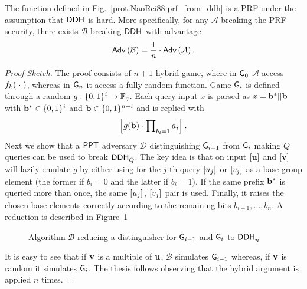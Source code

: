 \begin{proposition}
	\label{prop:NaoRei97}
	The function defined in Fig.~\ref{prot:NaoRei88:prf_from_ddh} is a PRF under the assumption that $\mathsf{DDH}^{}$ is hard.
	More specifically, for any $\mathcal{A}$ breaking the PRF security, there exists $\mathcal{B}$ breaking $\mathsf{DDH}^{}$ with advantage
	\[
		\mathsf{Adv}\left(\mathcal{B}\right) = \frac{1}{n} \cdot \mathsf{Adv}\left(\mathcal{A}\right).
	\]
\end{proposition}
\begin{proof}[Proof Sketch]
	The proof consists of $n+1$ hybrid game, where in $\mathsf{G}_0$ $\mathcal{A}$ access $f_k(\; \cdot \;)$, whereas in $\mathsf{G}_n$ it access a fully random function.
	Game $\mathsf{G}_i$ is defined through a random $g: \{0, 1\}^i \to \mathbb{F}_q$. 
	Each query input $x$ is parsed as $x = \mathbf{b}^\ast || \mathbf{b}$ with $\mathbf{b}^\ast \in \{0, 1\}^i$ and $\mathbf{b} \in \{0, 1\}^{n-i}$ and is replied with
	\[
		\left[{g(\mathbf{b}) \cdot \prod\nolimits_{b_i = 1} a_i}\right]_{}.
	\]
	Next we show that a $\mathsf{PPT}$ adversary $\mathcal{D}$ distinguishing $\mathsf{G}_{i-1}$ from $\mathsf{G}_i$ making $Q$ queries can be used to break $\mathsf{DDH}^{}_{Q}$.
	The key idea is that on input $\left[{\mathbf{u}}\right]_{}$ and $\left[{\mathbf{v}}\right]_{}$ will lazily emulate $g$ by either using for the $j$-th query $\left[{u_j}\right]_{}$ or $\left[{v_j}\right]_{}$ as a base group element (the former if $b_i = 0$ and the latter if $b_i = 1$).
	If the same prefix $\mathbf{b}^\ast$ is queried more than once, the same $\left[{u_j}\right]_{}$, $\left[{v_j}\right]_{}$ pair is used.
	Finally, it raises the chosen base elements correctly according to the remaining bits $b_{i+1}, \ldots, b_n$. 
	A reduction is described in Figure~\ref{prot:NaoRei97:DDH_reduction}
	
	\begin{figure}[htb]
	\centering
	\label{prot:NaoRei97:DDH_reduction}
	\caption{Algorithm $\mathcal{B}$ reducing a distinguisher for $\mathsf{G}_{i-1}$ and $\mathsf{G}_i$ to $\mathsf{DDH}^{}_n$}
	\end{figure}
	
	It is easy to see that if $\mathbf{v}$ is a multiple of $\mathbf{u}$, $\mathcal{B}$ simulates $\mathsf{G}_{i-1}$ whereas, if $\mathbf{v}$ is random it simulates $\mathsf{G}_i$.
	The thesis follows observing that the hybrid argument is applied $n$ times.
\end{proof}
